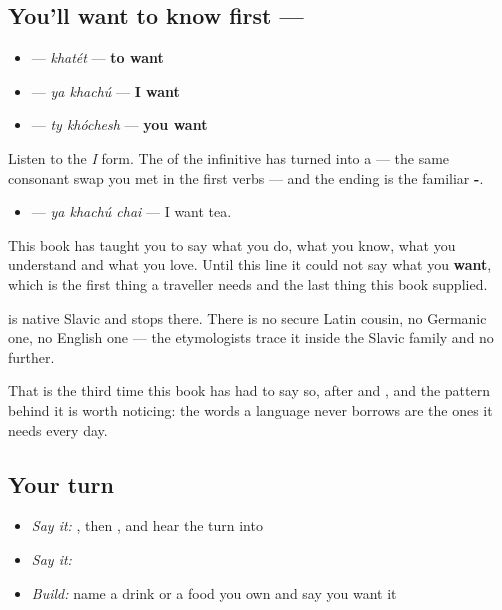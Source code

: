 \subsection*{You'll want to know first — }
\begin{itemize}
\raggedright
  \item \textbf{} — \emph{khatét} — \textbf{to want}
  \item \textbf{ } — \emph{ya khachú} — \textbf{I want}
  \item \textbf{ } — \emph{ty khóchesh} — \textbf{you want}
\end{itemize}

Listen to the \emph{I} form. The \textbf{} of the infinitive has turned into a \textbf{} — the same consonant swap you met in the first verbs — and the ending is the familiar \textbf{-}.

\begin{itemize}
\raggedright
  \item \textbf{  } — \emph{ya khachú chai} — I want tea.
\end{itemize}

This book has taught you to say what you do, what you know, what you understand and what you love. Until this line it could not say what you \textbf{want}, which is the first thing a traveller needs and the last thing this book supplied.

\begin{cousinweb}
\textbf{} is native Slavic and stops there. There is no secure Latin cousin, no Germanic one, no English one — the etymologists trace it inside the Slavic family and no further.

That is the third time this book has had to say so, after \textbf{} and \textbf{}, and the pattern behind it is worth noticing: the words a language never borrows are the ones it needs every day.
\end{cousinweb}

\subsection*{Your turn}
\begin{itemize}
\raggedright
  \item \emph{Say it:} \emph{}, then \emph{ }, and hear the \textbf{} turn into \textbf{}
  \item \emph{Say it:} \emph{  }
  \item \emph{Build:} name a drink or a food you own and say you want it
\end{itemize}

